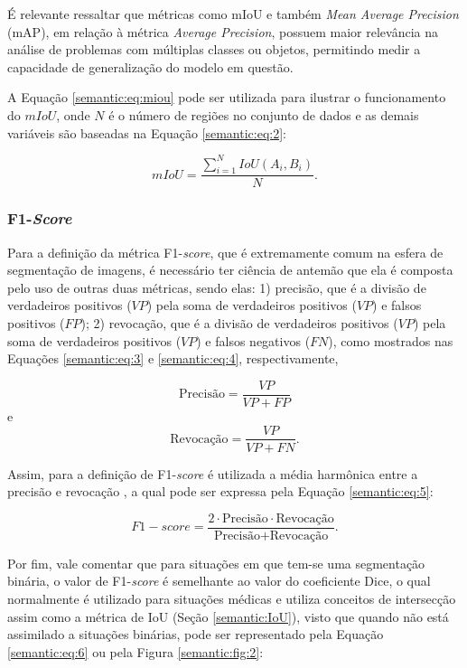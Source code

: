 É relevante ressaltar que métricas como mIoU e também \textit{Mean Average Precision} (mAP), em relação à métrica \textit{Average Precision}, possuem maior relevância na análise de problemas com múltiplas classes ou objetos, permitindo medir a capacidade de generalização do modelo em questão.

A Equação \ref{semantic:eq:miou} pode ser utilizada para ilustrar o funcionamento do $mIoU$, onde $N$ é o número de regiões no conjunto de dados e as demais variáveis são baseadas na Equação \ref{semantic:eq:2}:

\begin{equation}
    \label{semantic:eq:miou}
    mIoU = \frac{\sum_{i=1}^N IoU(A_i, B_i)}{N}.
\end{equation}

\subsubsection{F1-\textit{Score}}
\label{semantic:f1}
Para a definição da métrica F1-\textit{score}, que é extremamente comum na esfera de segmentação de imagens, é necessário ter ciência de antemão que ela é composta pelo uso de outras duas métricas, sendo elas: 1) precisão, que é a divisão de verdadeiros positivos ($VP$) pela soma de verdadeiros positivos ($VP$) e falsos positivos ($FP$); 2) revocação, que é a divisão de verdadeiros positivos ($VP$) pela soma de verdadeiros positivos ($VP$) e falsos negativos ($FN$), como mostrados nas Equações \ref{semantic:eq:3} e \ref{semantic:eq:4}, respectivamente,

\begin{equation}
    \label{semantic:eq:3}
    \text{Precisão} = \frac{VP}{VP + FP}
\end{equation}
e
\begin{equation}
    \label{semantic:eq:4}
    \text{Revocação} = \frac{VP}{VP + FN}.
\end{equation}

Assim, para a definição de F1-\textit{score} é utilizada a média harmônica entre a precisão e revocação \citep{Minaee2021}, a qual pode ser expressa pela Equação \ref{semantic:eq:5}:

\begin{equation}
    \label{semantic:eq:5}
    F1-score = \frac{2 \cdot \text{Precisão} \cdot \text{Revocação}}{\text{Precisão} + \text{Revocação}}.
\end{equation}

Por fim, vale comentar que para situações em que tem-se uma segmentação binária, o valor de F1-\textit{score} é semelhante ao valor do coeficiente Dice, o qual normalmente é utilizado para situações médicas \citep{Minaee2021} e utiliza conceitos de intersecção assim como a métrica de IoU (Seção \ref{semantic:IoU}), visto que quando não está assimilado a situações binárias, pode ser representado pela Equação \ref{semantic:eq:6} ou pela Figura \ref{semantic:fig:2}:

